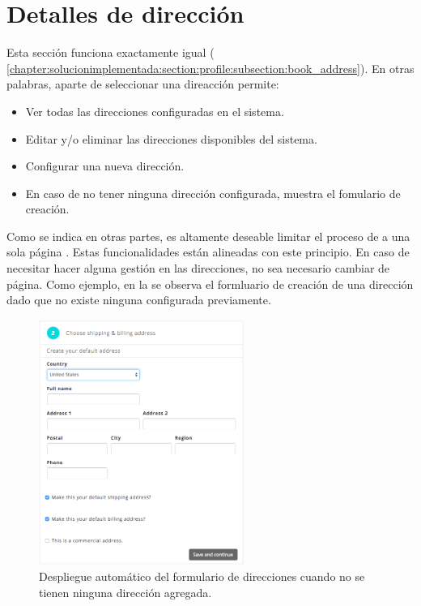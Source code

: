 \section{Detalles de dirección}\label{chapter:solucionimplementada:section:address}

	Esta sección funciona exactamente igual  ( \ref{chapter:solucionimplementada:section:profile:subsection:book_address}). En otras palabras, aparte de seleccionar una direacción permite:

	\begin{itemize}
		\item Ver todas las direcciones configuradas en el sistema.
		\item Editar y/o eliminar las direcciones disponibles del sistema.
		\item Configurar una nueva dirección.
		\item En caso de no tener ninguna dirección configurada, muestra el fomulario de creación.
	\end{itemize}

	Como se indica en otras partes, es altamente deseable limitar el proceso de \checkoutCOM a una sola página \cite{online_official_imediaconnection_best_practices_shopping_cart}. Estas funcionalidades están alineadas con este principio. En caso de necesitar hacer alguna gestión en las direcciones, no sea necesario cambiar de página.
	Como ejemplo, en la  se observa el formluario de creación de una dirección dado que no existe ninguna configurada previamente.

	\begin{figure}[H]
		\centering
		\includegraphics[width=0.6\textwidth]{figuras/shipping/form_address.png}
		\caption{Despliegue automático del formulario de direcciones cuando no se tienen ninguna dirección agregada.}
		\label{figure:checkout:form_address_default}
	\end{figure}